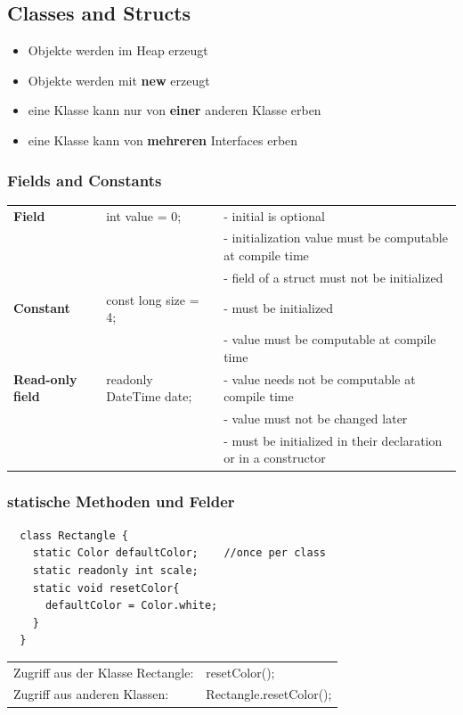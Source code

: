 \subsection{Classes and Structs}

\begin{itemize}
	\item Objekte werden im Heap erzeugt
	\item Objekte werden mit \textbf{new} erzeugt
	\item eine Klasse kann nur von \textbf{einer} anderen Klasse erben
	\item eine Klasse kann von \textbf{mehreren} Interfaces erben
\end{itemize}

\subsubsection{Fields and Constants}

\begin{tabular}{l|l|l}
	\textbf{Field}           & int value = 0;          & - initial is optional                                     \\
	                         &                         & - initialization value must be computable at compile time \\
	                         &                         & - field of a struct must not be initialized               \\ \hline
	\textbf{Constant}        & const long size = 4;     & - must be initialized                                     \\
	                         &                         & - value must be computable at compile time                \\ \hline
	\textbf{Read-only field} & readonly DateTime date; & - value needs not be computable at compile time           \\
	                         &                         & - value must not be changed later \\
	                         &                         & - must be initialized in their declaration or in a constructor \\
\end{tabular} 

\subsubsection{statische Methoden und Felder}
\begin{lstlisting}
  class Rectangle {
    static Color defaultColor;    //once per class
    static readonly int scale;
    static void resetColor{
      defaultColor = Color.white;
    }
  }
\end{lstlisting}
\begin{tabular}{ll}
  Zugriff aus der Klasse Rectangle:  & resetColor();\\
  Zugriff aus anderen Klassen: & Rectangle.resetColor();
\end{tabular}\\

